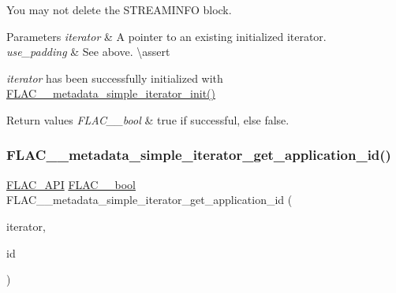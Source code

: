 You may not delete the S\+T\+R\+E\+A\+M\+I\+N\+FO block.


\begin{DoxyParams}{Parameters}
{\em iterator} & A pointer to an existing initialized iterator. \\
\hline
{\em use\+\_\+padding} & See above. \textbackslash{}assert 
\begin{DoxyCode}{1}
\end{DoxyCode}
 {\itshape iterator} has been successfully initialized with \mbox{\hyperlink{group__flac__metadata__level1_ga2a055cca4e6e06ae62517c8b0fa6e8a3}{F\+L\+A\+C\+\_\+\+\_\+metadata\+\_\+simple\+\_\+iterator\+\_\+init()}} \\
\hline
\end{DoxyParams}

\begin{DoxyRetVals}{Return values}
{\em F\+L\+A\+C\+\_\+\+\_\+bool} & {\ttfamily true} if successful, else {\ttfamily false}. \\
\hline
\end{DoxyRetVals}
\mbox{\label{group__flac__metadata__level1_gaf2db2a96f7c60100d620a2eefb8360bc}} 
\subsubsection{\texorpdfstring{FLAC\_\_metadata\_simple\_iterator\_get\_application\_id()}{FLAC\_\_metadata\_simple\_iterator\_get\_application\_id()}}
{\footnotesize\ttfamily \mbox{\hyperlink{group__flac__export_ga56ca07df8a23310707732b1c0007d6f5}{F\+L\+A\+C\+\_\+\+A\+PI}} \mbox{\hyperlink{ordinals_8h_a95103469f1cbd78b8cf250194985b34e}{F\+L\+A\+C\+\_\+\+\_\+bool}} F\+L\+A\+C\+\_\+\+\_\+metadata\+\_\+simple\+\_\+iterator\+\_\+get\+\_\+application\+\_\+id (\begin{DoxyParamCaption}\item[{\mbox{\hyperlink{group__flac__metadata__level1_ga6accccddbb867dfc2eece9ee3ffecb3a}{F\+L\+A\+C\+\_\+\+\_\+\+Metadata\+\_\+\+Simple\+Iterator}} $\ast$}]{iterator,  }\item[{\mbox{\hyperlink{ordinals_8h_a5eb569b12d5b047cdacada4d57924ee3}{F\+L\+A\+C\+\_\+\+\_\+byte}} $\ast$}]{id }\end{DoxyParamCaption})}

